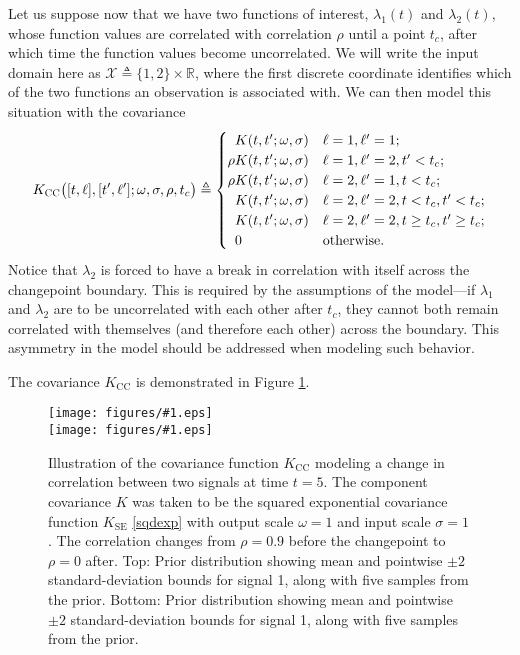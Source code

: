 \documentclass{article}
\newcommand{\deq}{\triangleq}
\newcommand{\psff}[1]{\texttt{[image: figures/\#1.eps]}}
\newcommand{\cm}[1]{\mathcal{#1}}
\newcommand{\R}{\mathbb{R}}
\begin{document}
Let us suppose now that we have two functions of interest,
$\lambda_1(t)$ and $\lambda_2(t)$, whose function values are
correlated with correlation $\rho$ until a point $t_c$, after which
time the function values become uncorrelated.  We will write the input
domain here as $\cm{X} \deq \lbrace 1, 2 \rbrace \times \R$, where the
first discrete coordinate identifies which of the two functions an
observation is associated with.  We can then model this situation with
the covariance
\begin{equation}
  \label{correlation}
  K_{\textsc{CC}}\bigl( [t, \ell], [t', \ell'] ; \omega, \sigma, \rho, t_c \bigr)
  \deq
  \begin{cases}
    \phantom{\rho}K(t, t'; \omega, \sigma) 
    & \ell = 1, \ell' = 1; \\
    \rho K(t, t'; \omega, \sigma) 
    & \ell = 1, \ell' = 2, t' < t_c; \\
    \rho K(t, t'; \omega, \sigma) 
    & \ell = 2, \ell' = 1, t < t_c; \\
    \phantom{\rho}K(t, t'; \omega, \sigma) 
    & \ell = 2, \ell' = 2, t < t_c, t' < t_c; \\
    \phantom{\rho}K(t, t'; \omega, \sigma) 
    & \ell = 2, \ell' = 2, t \geq t_c, t' \geq t_c; \\
    \phantom{\rho}0 & \text{otherwise.}
  \end{cases}
\end{equation}
Notice that $\lambda_2$ is forced to have a break in correlation with
itself across the changepoint boundary.  This is required by the
assumptions of the model---if $\lambda_1$ and $\lambda_2$ are to be
uncorrelated with each other after $t_c$, they cannot both remain
correlated with themselves (and therefore each other) across the
boundary.  This asymmetry in the model should be addressed when
modeling such behavior.

The covariance $K_{\text{CC}}$ is demonstrated in Figure
\ref{fig:changecorrelation}.

\begin{figure}
  \centering
  \psff{correlationcp_samples_1} \\
  \bigskip
  \psff{correlationcp_samples_2}\medskip
  \caption{Illustration of the covariance function $K_{\text{CC}}$
    modeling a change in correlation between two signals at time $t =
    \text{5}$.  The component covariance $K$ was taken to be the
    squared exponential covariance function $K_{\text{SE}}$
    \eqref{sqdexp} with output scale $\omega = 1$ and input scale
    $\sigma = 1$.  The correlation changes from $\rho = 0.9$ before
    the changepoint to $\rho = 0$ after. Top: Prior distribution
    showing mean and pointwise $\pm {2}$ standard-deviation
    bounds for signal 1, along with five samples from the prior.
    Bottom: Prior distribution showing mean and pointwise $\pm
    {2}$ standard-deviation bounds for signal 1, along with five
    samples from the prior.  }
  \label{fig:changecorrelation}
\end{figure}
\end{document}
